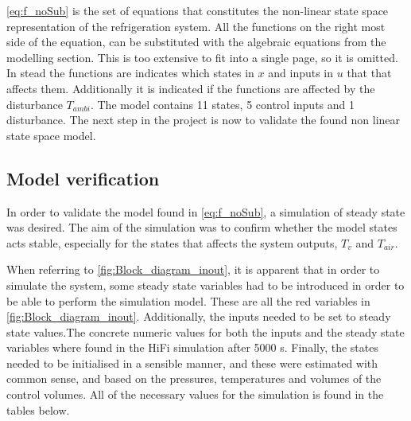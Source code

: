 \cref{eq:f_noSub} is the set of equations that constitutes the non-linear state space representation of the refrigeration system. All the functions on the right most side of the equation, can be substituted with the algebraic equations from the modelling section. This is too extensive to fit into a single page, so it is omitted. In stead the functions are indicates which states in $ x $ and inputs in $ u $ that that affects them. Additionally it is indicated if the functions are affected by the disturbance $ T_{ambi} $. The model contains 11 states, 5 control inputs and 1 disturbance. The next step in the project is now to validate the found non linear state space model.

\newpage
\subsection{Model verification}\label{sec:model-verification}
In order to validate the model found in \cref{eq:f_noSub}, a simulation of steady state was desired. The aim of the simulation was to confirm whether the model states acts stable, especially for the states that affects the system outputs, $T_v$ and $T_{air}$.

When referring to \cref{fig:Block_diagram_inout}, it is apparent that in order to simulate the system, some steady state variables had to be introduced in order to be able to perform the simulation model. These are all the red variables in \cref{fig:Block_diagram_inout}. Additionally, the inputs needed to be set to steady state values.The concrete numeric values for both the inputs and the steady state variables where found in the HiFi simulation after 5000 s. Finally, the states needed to be initialised in a sensible manner, and these were estimated with common sense, and based on the pressures, temperatures and volumes of the control volumes. All of the necessary values for the simulation is found in the tables below. \\


